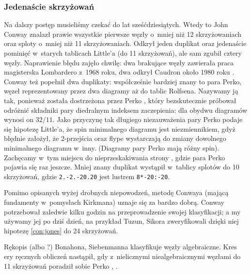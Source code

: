 
\subsubsection{Jedenaście skrzyżowań}
Na dalszy postęp musieliśmy czekać do lat sześćdziesiątych.
Wtedy to John Conway \cite{conway1970} znalazł prawie wszystkie pierwsze węzły o~mniej niż 12 skrzyżowaniach oraz sploty o~mniej niż 11 skrzyżowaniach.
%
Odkrył jeden duplikat oraz jedenaście pominięć w~starych tablicach Little'a (do 11 skrzyżowań), ale sam zgubił cztery węzły.
Naprawienie błędu zajęło chwilę: dwa brakujące węzły zawierała praca magisterska Lombardero z~1968 roku, dwa odkrył Caudron około 1980 roku \cite{caudron1982}.
%
%
Conway też popełnił dwa duplikaty: współcześnie bardziej znany to para Perko, węzeł reprezentowany przez dwa diagramy aż do tablic Rolfsena.
%
Nazywamy ją tak, ponieważ została dostrzeżona przez Perko \cite{perko1974}, który bezskutecznie próbował odróżnić składniki pary diedralnym indeksem zaczepienia: dla obydwu diagramów wynosi on $32/11$.
%
Jako przyczynę tak długiego niezauważenia pary Perko podaje się hipotezę Little'a, że spin minimalnego diagramu jest niezmiennikiem, gdyż błędnie założył, że 2-przejścia oraz flype wystarczają do zmiany dowolnego minimalnego diagramu w~inny.
%
%
%
% 
(Diagramy pary Perko mają różny spin).
Zachęcamy w~tym miejscu do nieprzeskakiwania strony \pageref{rolfsens_mistake}, gdzie para Perko pojawia się raz jeszcze.
Mniej znany duplikat wystąpił w~tablicy splotów do 10 skrzyżowań, gdzie \texttt{2.-2.-20.20} jest lustrem \texttt{8*-20:-20}.

Pomimo opisanych wyżej drobnych niepowodzeń, metodę Conwaya (mającą fundamenty w~pomysłach Kirkmana) uznaje się za bardzo dobrą.
Conway potrzebował zaledwie kilku godzin na przeprowadzenie swojej klasyfikacji; a my używamy jej po dziś dzień, na przykład Tuzun, Sikora zweryfikowali dzięki niej hipotezę \ref{con:jones} do 24 skrzyżowań.
%
%

Rękopis \cite{siebenmann1979} (albo \cite{bonahon1989}?) Bonahona, Siebenmanna klasyfikuje węzły algebraiczne.
%
%
Kres ery ręcznych obliczeń nastąpił, gdy z~nielicznymi niealgebraicznymi węzłami do 11 skrzyżowań poradził sobie Perko \cite{perko1980}, \cite{perko1982}.
%

